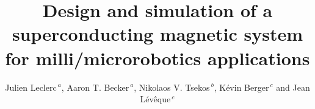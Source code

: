 \documentclass{ws-jmrr}
\begin{document}


\title{Design and simulation of a superconducting magnetic system for milli/microrobotics applications}

\author{Julien Leclerc$^{~a}$, Aaron T. Becker$^{~a}$, Nikolaos V. Tsekos$^{~b}$, K\'evin Berger$^{~c}$ and Jean L\'ev\^eque$^{~c}$}

\address{$^a$Dept. of Electrical and Computer Engineering, University of Houston, Houston, TX 70004, USA\\
E-mail: jleclerc@central.uh.edu}

\address{$^b$Dept. of Computer Science, University of Houston, Houston, TX 70004, USA}

\address{$^c$GREEN Laboratory, University of Lorraine, Vandoeuvre-l\`es-Nancy, 54506, France}

\maketitle
\end{document}
